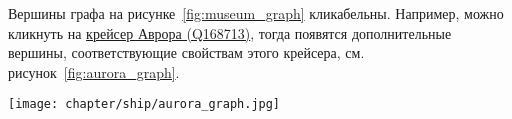 Вершины графа на рисунке~\ref{fig:museum_graph} кликабельны. Например, можно кликнуть на \href{https://www.wikidata.org/wiki/Q168713}{крейсер Аврора (Q168713)}, тогда появятся дополнительные вершины, соответствующие свойствам этого крейсера, см. рисунок~\ref{fig:aurora_graph}.

\newpage
\begin{figure*}[h]
  \texttt{[image: chapter/ship/aurora\_graph.jpg]}
  \caption[Граф свойств Авроры]{Граф свойств \href{https://www.wikidata.org/wiki/Q168713}{крейсера Аврора (Q168713)}.}%
  \label{fig:aurora_graph}%
\end{figure*}






